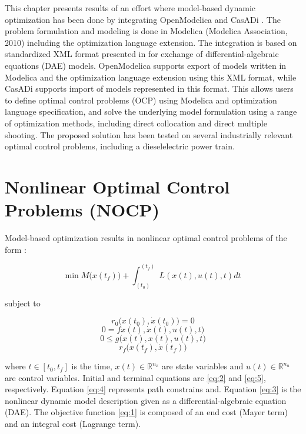 This chapter presents results of an effort where model-based dynamic optimization has been done by integrating
OpenModelica and CasADi \cite{casadi}. The problem formulation and modeling is done in Modelica 
(Modelica Association, 2010) including the optimization \cite{optimica} language extension. The integration is based
on standardized XML format presented in \cite{xml} for exchange of differential-algebraic equations (DAE)  models. 
OpenModelica supports export of models written in Modelica and the optimization language extension using this XML 
format, while CasADi supports import of models represented in this format. This allows users to define optimal control problems (OCP) using
Modelica and optimization language specification, and solve the underlying model formulation using a
range of optimization methods, including direct collocation and direct multiple shooting. The proposed
solution has been tested on several industrially relevant optimal control problems, including a dieselelectric
power train.

\section{Nonlinear Optimal Control Problems (NOCP)}
\label{sec:optimizationnocp}

Model-based optimization results in nonlinear optimal control problems of the form \cite{friesz}:

\begin{equation} \label{eq:1}
    \text{min}\; M \Big(x(t_f )\Big)+\int_{(t_0)}^{(t_f)}\; L(x(t),u(t),t) dt 
\end{equation}

subject to

\begin{equation} \label{eq:2}
	 r_0\Big(x(t_0),\dot{x}(t_0)\Big) = 0 
\end{equation}
\begin{equation}\label{eq:3}
	 0 = fx(t),\dot{x}(t),u(t),t\Big)
\end{equation}
\begin{equation}\label{eq:4}
	0 \leq g\Big(x(t),x(t),u(t),t\Big)
\end{equation}
\begin{equation}\label{eq:5}
	r_f\Big(x(t_f),\dot{x}(t_f)\Big)
\end{equation}

where $ t \in [t_0,t_f ] $ is the time, $ x(t) \in {\mathbb{R}}^ {n_x} $ are state variables and  $ u(t) \in {\mathbb{R}}^ {n_u}$ are control variables. Initial and terminal equations are \ref{eq:2} and \ref{eq:5}, respectively. Equation \ref{eq:4} represents path constrains and. Equation \ref{eq:3} is the nonlinear dynamic model description given as a differential-algebraic equation (DAE). The objective function \ref{eq:1} is composed of an end cost (Mayer term) and an integral cost (Lagrange term).

